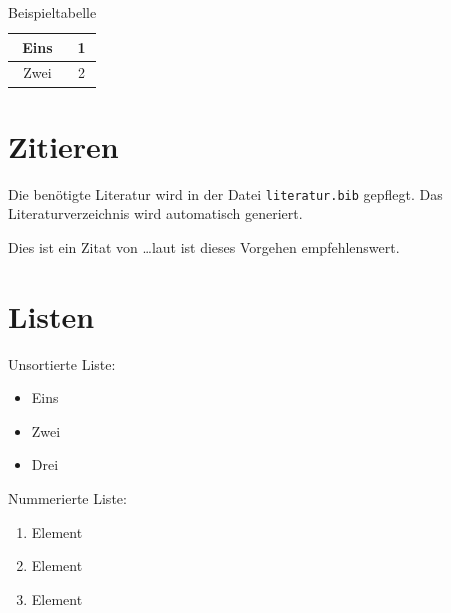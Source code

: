\begin{table}[hbtp]
  \begin{center}
    \begin{tabular}{|c|c|}
      \hline 
      \rule[-1ex]{0pt}{2.5ex} Eins & 1 \\ 
      \hline 
      \rule[-1ex]{0pt}{2.5ex} Zwei & 2 \\ 
      \hline
    \end{tabular}
  \end{center}
  \caption{Beispieltabelle}
  \label{tab:beispieltabelle}
\end{table}

\section{Zitieren}

Die benötigte Literatur wird in der Datei \texttt{literatur.bib} gepflegt. Das Literaturverzeichnis wird automatisch generiert.

Dies ist ein Zitat von \parencite{iso27001:2013} \dots laut \parencite[65\psqq]{iso27001:2013} ist dieses Vorgehen empfehlenswert.

\section{Listen}

Unsortierte Liste:

\begin{itemize}
 \item Eins
 \item Zwei
 \item Drei
\end{itemize}

\bigskip

\noindent
Nummerierte Liste:

\begin{enumerate}
 \item Element
 \item Element
 \item Element
\end{enumerate}

\indent